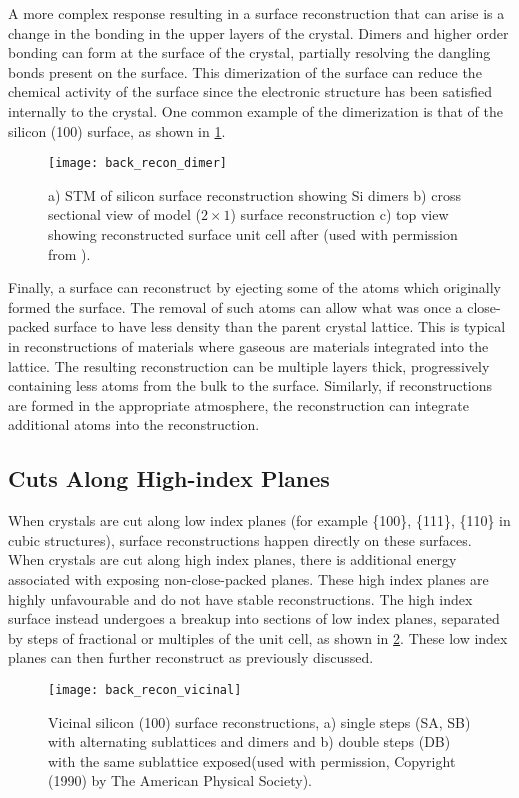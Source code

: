 A more complex response resulting in a surface reconstruction that can arise is a change in the bonding in the upper layers of the crystal.
Dimers and higher order bonding can form at the surface of the crystal, partially resolving the dangling bonds present on the surface.
This dimerization of the surface can reduce the chemical activity of the surface since the electronic structure has been satisfied internally to the crystal\cite{Duke1996}.
One common example of the dimerization is that of the silicon (100) surface, as shown in \cref{fig:back_recon_dimer}.
\begin{figure}
 \centering \texttt{[image: back\_recon\_dimer]}
 \caption[Silicon dimer surface reconstruction]{\label{fig:back_recon_dimer}a) STM of silicon surface reconstruction showing Si dimers b) cross sectional view of model (\(2 \times 1\)) surface reconstruction c) top view showing reconstructed surface unit cell after (used with permission from \cite{Zhang1997,Lagally1993}).}
\end{figure}

Finally, a surface can reconstruct by ejecting some of the atoms which originally formed the surface.
The removal of such atoms can allow what was once a close-packed surface to have less density than the parent crystal lattice.
This is typical in reconstructions of materials where gaseous are materials integrated into the lattice.
The resulting reconstruction can be multiple layers thick, progressively containing less atoms from the bulk to the surface.
Similarly, if reconstructions are formed in the appropriate atmosphere, the reconstruction can integrate additional atoms into the reconstruction.

\subsection{Cuts Along High-index Planes} When crystals are cut along low index planes (for example \{100\}, \{111\}, \{110\}  in cubic structures), surface reconstructions happen directly on these surfaces.
When crystals are cut along high index planes, there is additional energy associated with exposing non-close-packed planes.
These high index planes are highly unfavourable and do not have stable reconstructions.
The high index surface instead undergoes a breakup into sections of low index planes, separated by steps of fractional or multiples of the unit cell, as shown in \cref{fig:back_recon_vicinal}.
These low index planes can then further reconstruct as previously discussed.
\begin{figure}
 \centering \texttt{[image: back\_recon\_vicinal]}
 \caption[Silicon single and double step surface reconstructions]{\label{fig:back_recon_vicinal}Vicinal silicon (100) surface reconstructions, a) single steps (SA, SB) with alternating sublattices and dimers and b) double steps (DB) with the same sublattice exposed\cite{Alerhand1990}(used with permission, Copyright (1990) by The American Physical Society).}
\end{figure}

